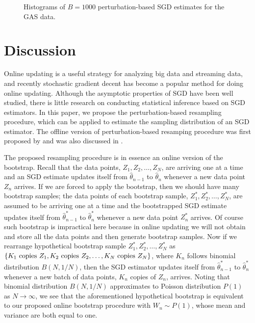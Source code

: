 \documentclass[twoside,11pt]{article}
\def\wh{\widehat}
\begin{document}
\begin{figure}[htb]
	\centering
	\label{fig:fig-real-glm-2}
	\caption{Histograms of $B=1000$ perturbation-based SGD estimates for the GAS data. }
\end{figure}

\section{Discussion} \label{discussion}

Online updating is a useful strategy for analyzing big data and streaming data, and recently stochastic gradient decent has become a popular method for doing online updating. Although the asymptotic properties of SGD have been well studied, there is little research on conducting statistical inference based on SGD estimators. In this paper, we propose the perturbation-based resampling procedure, which can be applied to estimate the sampling distribution of an SGD estimator. The offline version of perturbation-based resamping procedure was first proposed by \citet{Rubin81} and was also discussed in \citet{Shao12}.

The proposed resampling procedure is in essence an online version of the bootstrap. Recall that the data points, $Z_1, Z_2, \dots, Z_N$, are arriving one at a time and an SGD estimate updates itself from $\wh{\theta}_{n-1}$ to $\wh{\theta}_n$ whenever a new data point $Z_n$ arrives. If we are forced to apply the bootstrap, then we should have many bootstrap samples; the data points of each bootstrap sample, $Z_1^*, Z_2^*, \dots, Z_N^*$, are assumed to be arriving one at a time and the bootstrapped SGD estimate updates itself from $\wh{\theta}^*_{n-1}$ to $\wh{\theta}^*_n$ whenever a new data point $Z_n^*$ arrives. Of course such bootstrap is impractical here because in online updating we will not obtain and store all the data points and then generate bootstrap samples. Now if we rearrange hypothetical bootstrap sample $Z_1^*, Z_2^*, \dots, Z_N^*$ as $\{K_1 {\rm \ copies\ } Z_1, K_2 {\rm \ copies\ } Z_2, \dots, K_N {\rm \ copies\ } Z_N\}$, where $K_n$ follows binomial distribution $B(N, 1/N)$, then the SGD estimator updates itself from $\wh{\theta}^*_{n-1}$ to $\wh{\theta}^*_n$ whenever a new batch of data points, $K_n$ copies of $Z_n$, arrives. Noting that binomial distribution $B(N, 1/N)$ approximates to Poisson distribution $P(1)$ as $N\rightarrow\infty$, we see that the aforementioned hypothetical bootstrap is equivalent to our proposed online bootstrap procedure with $W_n\sim P(1)$, whose mean and variance are both equal to one.
\end{document}
